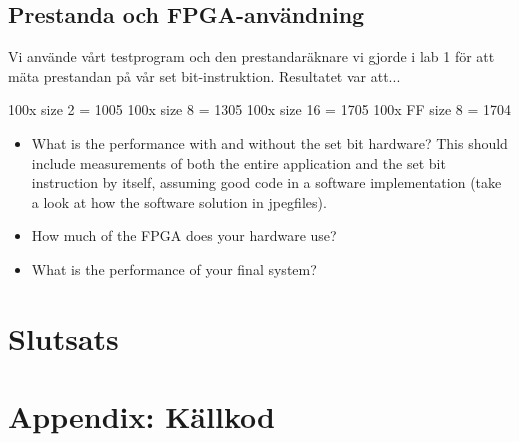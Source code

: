 \documentclass[a4paper]{article}
\begin{document}
\subsection{Prestanda och FPGA-användning}
Vi använde vårt testprogram och den prestandaräknare vi gjorde i lab 1 för att mäta prestandan på
vår set bit-instruktion. Resultatet var att...%



100x size 2 = 1005
100x size 8 = 1305
100x size 16 = 1705
100x FF size 8 = 1704




\begin{itemize}
\item What is the performance with and without the set bit hardware? This should include measurements of both the entire application and the set bit instruction by itself, assuming good code in a software implementation (take a look at how the software solution in jpegfiles).
\item How much of the FPGA does your hardware use?
\item What is the performance of your final system?
\end{itemize}

\section{Slutsats}


\section{Appendix: Källkod}
\end{document}
